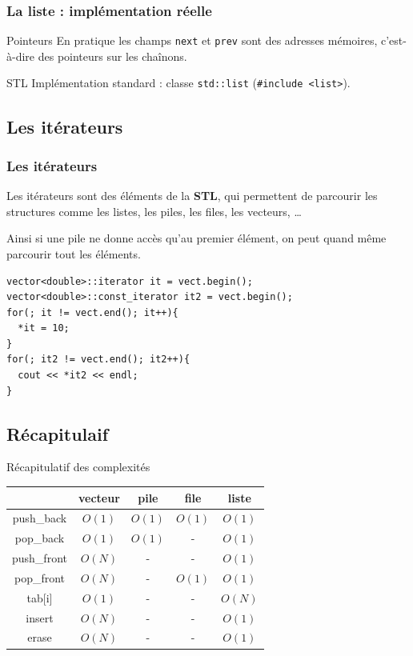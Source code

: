 \documentclass{beamer}
\begin{document}
\begin{frame}
\frametitle{La liste : implémentation réelle}

\begin{block}{Pointeurs}
En pratique les champs \texttt{next} et \texttt{prev} sont des adresses mémoires, c'est-à-dire des pointeurs sur les chaînons.
\end{block}

\begin{exampleblock}{STL}
Implémentation standard : classe \texttt{std::list} (\texttt{\#include <list>}).
\end{exampleblock}

\end{frame}

\subsection{Les itérateurs}

\begin{frame}[fragile]
\frametitle{Les itérateurs}
Les itérateurs sont des éléments de la \textbf{STL}, qui permettent de parcourir les structures comme les listes, les piles, les files, les vecteurs, \dots

Ainsi si une pile ne donne accès qu'au premier élément, on peut quand même parcourir tout les éléments.

\begin{verbatim}
vector<double>::iterator it = vect.begin();
vector<double>::const_iterator it2 = vect.begin();
for(; it != vect.end(); it++){
  *it = 10;
}
for(; it2 != vect.end(); it2++){
  cout << *it2 << endl;
}
\end{verbatim}
\end{frame}

\subsection{Récapitulaif}

\begin{frame}{Récapitulatif des complexités}
\begin{center}
\begin{tabular}{ c | c | c | c | c }
& vecteur & pile & file & liste\\
\hline
push\_back & $O(1)$ & $O(1)$ & $O(1)$ & $O(1)$\\
\hline
pop\_back & $O(1)$ & $O(1)$ & - & $O(1)$\\
\hline
push\_front & $O(N)$ & - & - & $O(1)$\\
\hline
pop\_front & $O(N)$ & - & $O(1)$ & $O(1)$\\
\hline
tab[i] & $O(1)$ & - & - & $O(N)$\\
\hline
insert & $O(N)$ & - & - & $O(1)$\\
\hline
erase & $O(N)$ & - & - & $O(1)$\\
\hline
\end{tabular}
\end{center}
\end{frame}
\end{document}
